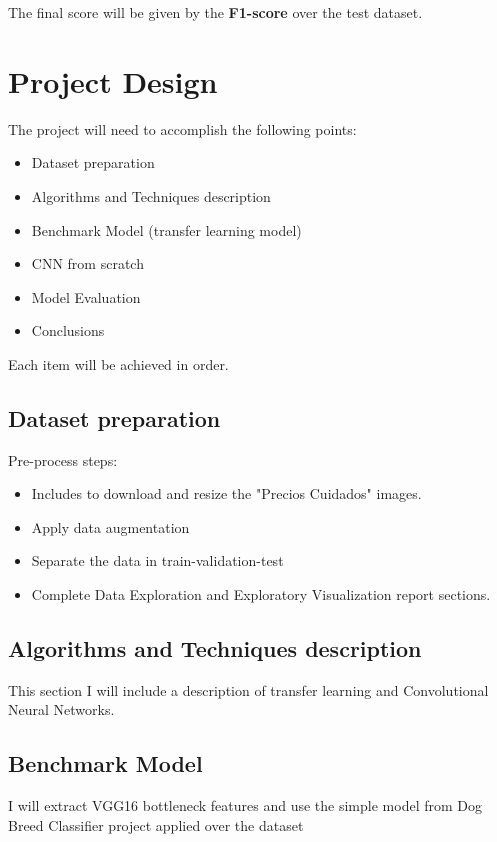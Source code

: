 \documentclass[a4paper,10pt]{article}
\begin{document}
The final score will be given by the \textbf{F1-score} over the test dataset.

\section{Project Design}

The project will need to accomplish the following points:
\begin{itemize}
  \item Dataset preparation
  \item Algorithms and Techniques description
  \item Benchmark Model (transfer learning model)
  \item CNN from scratch 
  \item Model Evaluation
  \item Conclusions
\end{itemize}

Each item will be achieved in order.


\subsection{Dataset preparation}

Pre-process steps: 
\begin{itemize}
  \item Includes to download and resize the "Precios Cuidados" images.
  \item Apply data augmentation 
  \item Separate the data in train-validation-test
  \item Complete Data Exploration and Exploratory Visualization report sections.
\end{itemize}

\subsection{Algorithms and Techniques description}

This section I will include a description of transfer learning and Convolutional Neural Networks. 

\subsection{Benchmark Model}

I will extract VGG16 bottleneck features and use the simple model from Dog Breed Classifier project applied over the dataset
\end{document}
